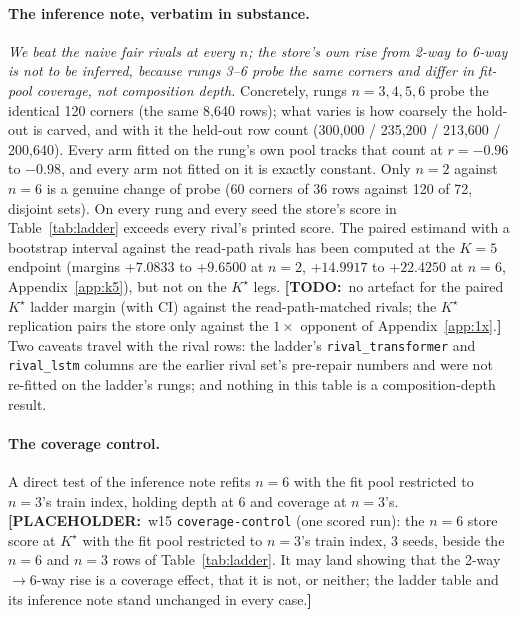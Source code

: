 \documentclass{article} %
\newcommand{\PLACEHOLDER}[1]{{\color{red}\textbf{[PLACEHOLDER:}~#1\textbf{]}}}
\newcommand{\TODO}[1]{{\color{orange}\textbf{[TODO:}~#1\textbf{]}}}
\newcommand{\Kstar}{\ensuremath{K^{\star}}}
\begin{document}
\paragraph{The inference note, verbatim in substance.} \emph{We beat the naive fair rivals at
every $n$; the store's own rise from 2-way to 6-way is not to be inferred, because rungs 3--6
probe the same corners and differ in fit-pool coverage, not composition depth.} Concretely,
rungs $n=3,4,5,6$ probe the identical 120 corners (the same 8,640 rows); what varies is how
coarsely the hold-out is carved, and with it the held-out row count (300,000 / 235,200 /
213,600 / 200,640). Every arm fitted on the rung's own pool tracks that count at
$r=-0.96$ to $-0.98$, and every arm not fitted on it is exactly constant.
Only $n=2$ against $n=6$ is a genuine change of probe (60 corners of 36 rows against 120 of
72, disjoint sets). %
On every rung and every seed the store's score in Table~\ref{tab:ladder} exceeds every
rival's printed score. The paired estimand with a bootstrap interval against the read-path
rivals has been computed at the $K=5$ endpoint (margins $+7.0833$ to $+9.6500$ at $n=2$,
$+14.9917$ to $+22.4250$ at $n=6$, Appendix~\ref{app:k5}), but not on the $\Kstar$ legs.
\TODO{no artefact for the paired $\Kstar$ ladder margin (with CI) against the read-path-matched
rivals; the $\Kstar$ replication pairs the store only against the $1\times$ opponent of
Appendix~\ref{app:1x}.}
Two caveats travel with the rival rows: the ladder's \texttt{rival\_transformer} and
\texttt{rival\_lstm} columns are the earlier rival set's pre-repair numbers and were not
re-fitted on the ladder's rungs; and nothing in this table is a composition-depth result.

\paragraph{The coverage control.} A direct test of the inference note refits $n=6$ with the
fit pool restricted to $n=3$'s train index, holding depth at 6 and coverage at $n=3$'s.
\PLACEHOLDER{w15 \texttt{coverage-control} (one scored run): the $n=6$ store score at $\Kstar$
with the fit pool restricted to $n=3$'s train index, 3 seeds, beside the $n=6$ and $n=3$ rows
of Table~\ref{tab:ladder}. It may land showing that the 2-way$\to$6-way rise is a coverage
effect, that it is not, or neither; the ladder table and its inference note stand unchanged in
every case.}
\end{document}
